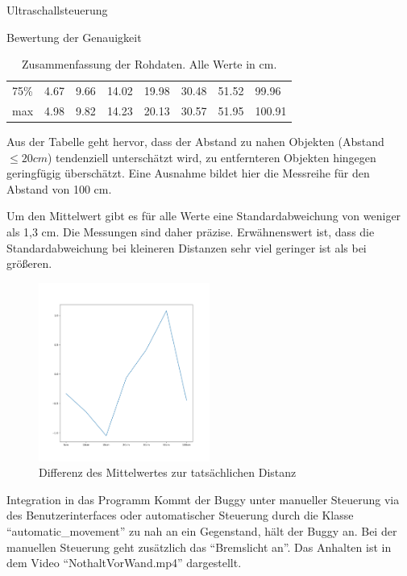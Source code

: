 \documentclass[12pt]{report}
\begin{document}
\begin{section}{Ultraschallsteuerung}
\begin{subsection}{Bewertung der Genauigkeit}
\begin{table}[h!]
\begin{tabularx}{\textwidth}{XXXXXXXX}
            75\%   &    4.67 &    9.66 &   14.02 &   19.98 &   30.48 &   51.52 &   99.96 \\
            max   &    4.98 &    9.82 &   14.23 &   20.13 &   30.57 &   51.95 &  100.91 \\
          \end{tabularx}
        \caption{Zusammenfassung der Rohdaten. Alle Werte in cm.}
    \end{table}
    Aus der Tabelle geht hervor, dass der Abstand zu nahen
    Objekten (Abstand $\leq{} 20 cm$) tendenziell unterschätzt wird, zu entfernteren
    Objekten hingegen geringfügig überschätzt. Eine Ausnahme bildet hier die
    Messreihe für den Abstand von 100 cm.
    
    Um den Mittelwert gibt es für alle Werte eine Standardabweichung von weniger
    als 1,3 cm. Die Messungen sind daher präzise. Erwähnenswert ist, dass die
    Standardabweichung bei kleineren Distanzen sehr viel geringer ist als bei größeren.

    \begin{figure}[H]
      \centering
      \includegraphics[width=0.5\textwidth]{test_data_ultrasonic/meanDiff.png}
      \caption{Differenz des Mittelwertes zur tatsächlichen Distanz}
    \end{figure}

  \end{subsection}
  \begin{subsection}{Integration in das Programm}
    Kommt der Buggy unter manueller Steuerung via des Benutzerinterfaces oder
    automatischer Steuerung durch die Klasse "`automatic\_movement"' zu nah
    an ein Gegenstand, hält der Buggy an. Bei der manuellen Steuerung geht zusätzlich
    das "`Bremslicht an"'.
    Das Anhalten ist in dem Video "`NothaltVorWand.mp4"' dargestellt.
  \end{subsection}

\end{section}
\end{document}

